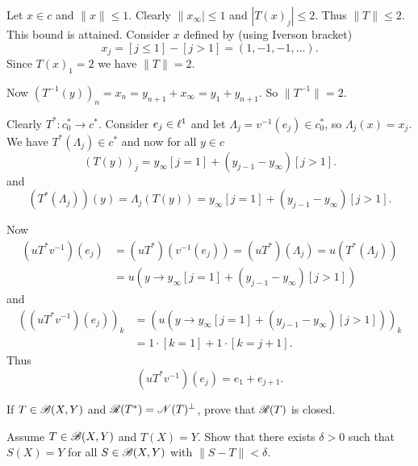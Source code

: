 \begin{enumerate}
\begin{itemize}
Let \(x\in c\) and \(\|x\| \leq 1\). Clearly \(\|x_\infty| \leq 1\)
and \(|T(x)_j| \leq 2\). Thus \(\|T\| \leq 2\).
This bound is attained. Consider $x$ defined by (using Iverson bracket)
\begin{equation*}
x_j = [j \leq 1] - [j > 1] = (1, -1, -1, \ldots).
\end{equation*}
Since \(T(x)_1 = 2\) we have \(\|T\| = 2\).

Now \((T^{-1}(y))_n = x_n = y_{n+1} + x_\infty = y_1 + y_{n+1}\).
So \(\|T^{-1}\| = 2\).

Clearly \(T^*: c_0^* \to c^*\). Consider \(e_j \in \ell^1\)
and let \(\Lambda_j = v^{-1}(e_j)  \in c_0^*\),
so \(\Lambda_j(x) = x_j\).
We have \(T^* (\Lambda_j) \in c^*\) and now for all \(y\in c\)
\begin{equation*}
\left(T(y)\right)_j = y_\infty[j = 1] + (y_{j - 1} - y_\infty)[j > 1].
\end{equation*}
and
\begin{equation*}
\left(T^*(\Lambda_j)\right)(y)
 = \Lambda_j\left(T(y)\right)
 = y_\infty[j = 1] + (y_{j - 1} - y_\infty)[j > 1].
\end{equation*}

Now %
\begin{align*}
\left(uT^*v^{-1}\right)(e_j)
 &= \left(uT^*\right)\left(v^{-1}(e_j)\right)
  = \left(uT^*\right)(\Lambda_j)
  = u\left(T^*(\Lambda_j)\right) \\
 &= u\left(y \to y_\infty[j = 1] + (y_{j - 1} - y_\infty)[j > 1]\right)
\end{align*}
and
\begin{align*}
\left(\left(uT^*v^{-1}\right)(e_j)\right)_k
 &= \left(u\left(
      y \to y_\infty[j = 1] + (y_{j - 1} - y_\infty)[j > 1]\right)\right)_k \\
 &= 1\cdot[k = 1] + 1\cdot[k = j + 1].
\end{align*}
Thus
\begin{equation*}
\left(uT^*v^{-1}\right)(e_j) = e_1 + e_{j + 1}.
\end{equation*}

\end{itemize}


\begin{excopy}
If \(T \in \mathscr{B}(X,Y)\) and \(\mathscr{R}(T^*) = \mathscr{N}(T)^\perp\),
prove that \(\mathscr{R}(T)\) is closed.
\end{excopy}

\unfinished

\begin{excopy}
Assume \(T \in \mathscr{B}(X,Y)\) and \(T(X)=Y\). Show that there exists \(\delta>0\)
such that \(S(X)=Y\) for all \(S\in\mathscr{B}(X,Y)\) with \(\|S-T\|<\delta\).
\end{excopy}


\end{enumerate}
